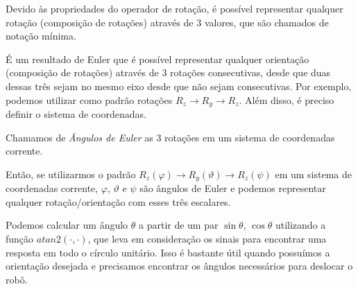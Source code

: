 
Devido às propriedades do operador de rotação, é possível representar qualquer rotação (composição de rotações) através de 3 valores, que são chamados de notação mínima.

É um resultado de Euler que é possível representar qualquer orientação (composição de rotações) através de 3 rotações consecutivas, desde que duas dessas três sejam no mesmo eixo desde que não sejam consecutivas. Por exemplo, podemos utilizar como padrão rotações $R_z \to R_y \to R_z$. Além disso, é preciso definir o sistema de coordenadas.

\begin{definition}
    Chamamos de \emph{Ângulos de Euler} as 3 rotações em um sistema de coordenadas corrente.
\end{definition}

Então, se utilizarmos o padrão $R_z(\varphi) \to R_y(\vartheta) \to R_z(\psi)$ em um sistema de coordenadas corrente, $\varphi$, $\vartheta$ e $\psi$ são ângulos de Euler e podemos representar qualquer rotação/orientação com esses três escalares.

\begin{note}
    Podemos calcular um ângulo $\theta$ a partir de um par $\sin\theta$, $\cos\theta$ utilizando a função $atan2(\cdot ,\cdot )$, que leva em consideração os sinais para encontrar uma resposta em todo o círculo unitário. Isso é bastante útil quando possuímos a orientação desejada e precisamos encontrar os ângulos necessários para deslocar o robô.
\end{note}

